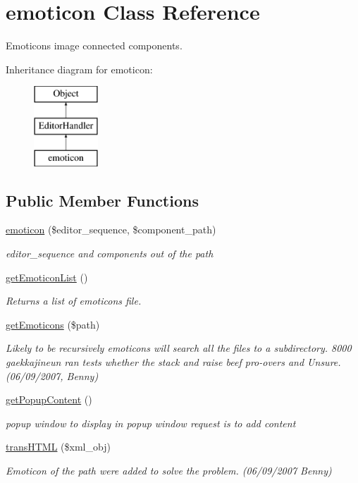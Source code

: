 \hypertarget{classemoticon}{}\section{emoticon Class Reference}
\label{classemoticon}


Emoticons image connected components.  


Inheritance diagram for emoticon\+:\begin{figure}[H]
\begin{center}
\leavevmode
\includegraphics[height=3.000000cm]{classemoticon}
\end{center}
\end{figure}
\subsection*{Public Member Functions}
\begin{DoxyCompactItemize}
\item 
\hyperlink{classemoticon_a8b042772a4d61cfcbdecbe945102a997}{emoticon} (\$editor\+\_\+sequence, \$component\+\_\+path)
\begin{DoxyCompactList}\small\item\em editor\+\_\+sequence and components out of the path \end{DoxyCompactList}\item 
\hyperlink{classemoticon_ac8b67c22af9daf48fb1d95f4fea2d07e}{get\+Emoticon\+List} ()
\begin{DoxyCompactList}\small\item\em Returns a list of emoticons file. \end{DoxyCompactList}\item 
\hyperlink{classemoticon_a95bdb6fcf406fc9882332a3b5f01542c}{get\+Emoticons} (\$path)
\begin{DoxyCompactList}\small\item\em Likely to be recursively emoticons will search all the files to a subdirectory. 8000 gaekkajineun ran tests whether the stack and raise beef pro-\/overs and Unsure. (06/09/2007, Benny) \end{DoxyCompactList}\item 
\hyperlink{classemoticon_afe901b31a28bed049ed8d553e996736d}{get\+Popup\+Content} ()
\begin{DoxyCompactList}\small\item\em popup window to display in popup window request is to add content \end{DoxyCompactList}\item 
\hyperlink{classemoticon_ae88c968e3b183a101c96d8013b4bf926}{trans\+H\+T\+M\+L} (\$xml\+\_\+obj)
\begin{DoxyCompactList}\small\item\em Emoticon of the path were added to solve the problem. (06/09/2007 Benny) \end{DoxyCompactList}\end{DoxyCompactItemize}
